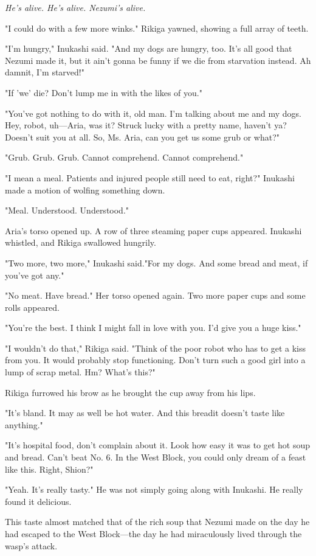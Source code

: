 \emph{He's alive. He's alive. Nezumi's alive.}

"I could do with a few more winks." Rikiga yawned, showing a full array
of teeth.

"I'm hungry," Inukashi said. "And my dogs are hungry, too. It's all good
that Nezumi made it, but it ain't gonna be funny if we die from
starvation instead. Ah damnit, I'm starved!"

"If 'we' die? Don't lump me in with the likes of you."

"You've got nothing to do with it, old man. I'm talking about me and my
dogs. Hey, robot, uh---Aria, was it? Struck lucky with a pretty name,
haven't ya? Doesn't suit you at all. So, Ms. Aria, can you get us some
grub or what?"

{\sffamily "Grub. Grub. Grub. Cannot comprehend. Cannot comprehend."}

"I mean a meal. Patients and injured people still need to eat, right?"
Inukashi made a motion of wolfing something down.

{\sffamily "Meal. Understood. Understood."}

Aria's torso opened up. A row of three steaming paper cups appeared.
Inukashi whistled, and Rikiga swallowed hungrily.

"Two more, two more," Inukashi said."For my dogs. And some bread and
meat, if you've got any."

{\sffamily "No meat. Have bread."} Her torso opened again. Two more paper cups and
some rolls appeared.

"You're the best. I think I might fall in love with you. I'd give you a
huge kiss."

"I wouldn't do that," Rikiga said. "Think of the poor robot who has to
get a kiss from you. It would probably stop functioning. Don't turn such
a good girl into a lump of scrap metal. Hm? What's this?"

Rikiga furrowed his brow as he brought the cup away from his lips.

"It's bland. It may as well be hot water. And this bread\el it doesn't
taste like anything."

"It's hospital food, don't complain about it. Look how easy it was to
get hot soup and bread. Can't beat No. 6. In the West Block, you could
only dream of a feast like this. Right, Shion?"

"Yeah. It's really tasty." He was not simply going along with Inukashi.
He really found it delicious.

This taste almost matched that of the rich soup that Nezumi made on the
day he had escaped to the West Block---the day he had miraculously lived
through the wasp's attack.

